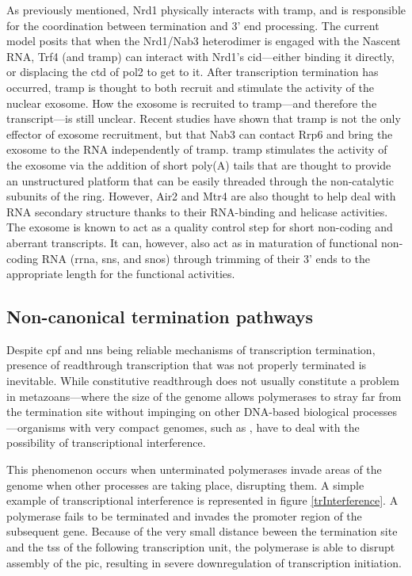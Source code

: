 As previously mentioned, Nrd1 physically interacts with \gls{tramp}, and is responsible for the coordination between termination and 3' end processing.
The current model posits that when the Nrd1/Nab3 heterodimer is engaged with the Nascent RNA, Trf4 (and \gls{tramp}) can interact with Nrd1's \gls{cid}---either binding it directly, or displacing the \gls{ctd} of \gls{pol2} to get to it\cite{tudek:2014:molecular}.
After transcription termination has occurred, \gls{tramp} is thought to both recruit and stimulate the activity of the nuclear exosome.
How the exosome is recruited to \gls{tramp}---and therefore the transcript---is still unclear.
Recent studies have shown that \gls{tramp} is not the only effector of exosome recruitment, but that Nab3 can contact Rrp6 and bring the exosome to the RNA independently of \gls{tramp}.
\gls{tramp} stimulates the activity of the exosome via the addition of short poly(A) tails that are thought to provide an unstructured platform that can be easily threaded through the non-catalytic subunits of the ring. 
However, Air2 and Mtr4 are also thought to help deal with RNA secondary structure thanks to their RNA-binding and helicase activities.  
The exosome is known to act as a quality control step for short non-coding and aberrant transcripts.
It can, however, also act as in maturation of functional non-coding RNA (\gls{rrna}, \gls{sns}, and \gls{snos}) through trimming of their 3' ends to the appropriate length for the functional activities.

\subsection{Non-canonical termination pathways}

Despite \gls{cpf} and \gls{nns} being reliable mechanisms of transcription termination, presence of readthrough transcription that was not properly terminated is inevitable.
While constitutive readthrough does not usually constitute a problem in metazoans---where the size of the genome allows polymerases to stray far from the termination site without impinging on other DNA-based biological processes---organisms with very compact genomes, such as \cer{}, have to deal with the possibility of transcriptional interference.

This phenomenon occurs when unterminated polymerases invade areas of the genome when other processes are taking place, disrupting them.
A simple example of transcriptional interference is represented in figure \ref{trInterference}.
A polymerase fails to be terminated and invades the promoter region of the subsequent gene.
Because of the very small distance beween the termination site and the \gls{tss} of the following transcription unit, the polymerase is able to disrupt assembly of the \gls{pic}, resulting in severe downregulation of transcription initiation.


